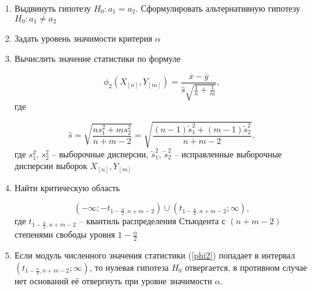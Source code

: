 \begin{enumerate}
	\item Выдвинуть гипотезу $H_0: a_1 = a_2$. Сформулировать альтернативную гипотезу $H_0: a_1 \ne a_2$
	\item Задать уровень значимости критерия $\alpha$
	\item Вычислить значение статистики по формуле
	
	\begin{equation}\label{phi2}
		\phi_2\left(X_{[n]}, Y_{[m]}\right) = \frac{\overline{x} - \overline{y}}{\hat{s}\sqrt{\frac{1}{n} + \frac{1}{m}}},
	\end{equation}
	где
	
	\begin{equation}
		\hat{s} = \sqrt{\frac{ns^2_1 + ms^2_2}{n + m - 2}} = \sqrt{\frac{(n - 1) \tilde{s}^2_1 + (m - 1) \tilde{s}^2_2}{n + m - 2}},
	\end{equation}
	где $s^2_1$, $s^2_2$ -- выборочные дисперсии, $\tilde{s}^2_1$, $\tilde{s}^2_2$ -- исправленные выборочные дисперсии выборок $X_{[n]}, Y_{[m]}$
	
	\item Найти критическую область
	
	\begin{equation}
		\left(-\infty; -t_{1 - \frac{\alpha}{2}, n + m - 2} \right) \cup \left(t_{1 - \frac{\alpha}{2}, n + m - 2}; \infty \right),
	\end{equation}
	где $t_{1 - \frac{\alpha}{2}, n + m - 2}$ -- квантиль распределения Стьюдента с $(n + m - 2)$ степенями свободы уровня $1 - \frac{\alpha}{2}$
	
	\item Если модуль численного значения статистики (\ref{phi2}) попадает в интервал $\left(t_{1 - \frac{\alpha}{2}, n + m - 2}; \infty \right)$, то нулевая гипотеза $H_0$ отвергается, в противном случае нет оснований её отвергнуть при уровне значимости $\alpha$.
\end{enumerate}
